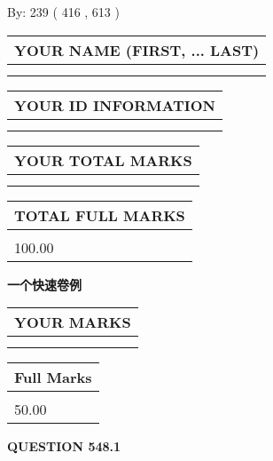\documentclass{ctexart}
\begin{document}
   
\hspace{1.0in} By: 
 239 ( 416 ,  613 )
   
   
   
   
\newpage 
\setcounter{page}{ 
   548001 } 
   
   
   
   
\noindent\begin{tabular}{|l|}
\hline
YOUR NAME (FIRST, ... LAST)  \\
\hline
 \\ 
 \\ 
\hline
\end{tabular}
\hspace{0.05in} \begin{tabular}{|l|}
\hline
 YOUR   ID   INFORMATION  \\
\hline
 \\ 
 \\ 
\hline
\end{tabular}
   
   
\vspace{0.2in}\noindent\begin{tabular}{|l|}
\hline
YOUR TOTAL MARKS  \\
\hline
 \\ 
 \\ 
\hline
\end{tabular}
\hspace{0.05in} \begin{tabular}{|l|}
\hline
TOTAL FULL MARKS  \\
\hline
 \\ 
100.00 \\
\hline
\end{tabular}
   
   
 \vspace{0.2in}
{\LARGE {\textbf{ 一个快速卷例}}}
   
   
  
\vspace{0.2in}
  
\noindent\begin{tabular}{|l|}
\hline
 YOUR MARKS  \\
\hline
 \\ 
 \\ 
\hline
\end{tabular}
\hspace{0.05in} \begin{tabular}{|l|}
\hline
 Full Marks  \\
\hline
 \\ 
50.00 \\
\hline
\end{tabular}
{\textbf{\Large{QUESTION
548.1 
}}}
  
\end{document}
